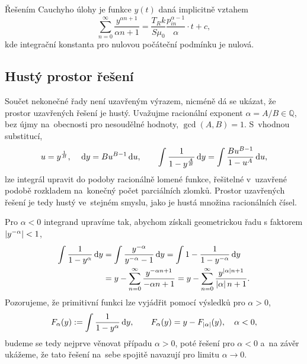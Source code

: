 Řešením Cauchyho úlohy  je funkce $y(t)$ daná implicitně vztahem
\begin{equation}\label{eq:general_cauchy_problem_alpha_solution}
    \sum_{n=0}^{\infty}\frac{y^{\alpha n+1}}{\alpha n+1}=\frac{T_R k}{S \mu_0}\frac{p_{in}^{\alpha-1}}{\alpha}\cdot t+c,
\end{equation}
kde integrační konstanta pro nulovou počáteční podmínku je nulová.


\subsection{Hustý prostor řešení}\label{ss:husty_prostor_reseni}
Součet nekonečné řady není uzavřeným výrazem, nicméně dá se ukázat, že prostor uzavřených řešení je hustý. Uvažujme racionální exponent $\alpha =A/B\in\mathbb{Q}$, bez újmy na~obecnosti pro nesoudělné hodnoty, $\gcd(A,B)=1$. S~vhodnou substitucí,
\begin{equation}\label{eq:rational_substitution}
    u=y^{\frac{1}{B}},\quad \,\mathrm{d}{y}=Bu^{B-1}\,\mathrm{d}{u},\qquad \int\frac{1}{1-y^{\frac{A}{B}}}\,\mathrm{d}{y}=\int\frac{Bu^{B-1}}{1-u^A}\,\mathrm{d}{u},
\end{equation}
lze integrál upravit do podoby racionálně lomené funkce, řešitelné v~uzavřené podobě rozkladem na~konečný počet parciálních zlomků. Prostor uzavřených řešení je tedy hustý ve~stejném smyslu, jako je hustá množina racionálních čísel.

Pro $\alpha<0$ integrand upravíme tak, abychom získali geometrickou řadu s faktorem $\left\lvert y^{-\alpha}\right\rvert<1$,
\begin{align}\label{eq:negative_alpha_absolute_value}
    \int\frac{1}{1-y^{\alpha}}\,\mathrm{d}{y}
    &=\int\frac{y^{-\alpha}}{y^{-\alpha}-1}\,\mathrm{d}{y}
    =\int 1-\frac{1}{1-y^{-\alpha}}\,\mathrm{d}{y}\nonumber\\
    &=y-\sum_{n=0}^{\infty}\frac{y^{-\alpha n+1}}{-\alpha n+1}
    =y-\sum_{n=0}^{\infty}\frac{y^{\left\lvert\alpha\right\rvert n+1}}{\left\lvert\alpha\right\rvert n+1}.
\end{align}
Pozorujeme, že primitivní funkci lze vyjádřit pomocí výsledků pro $\alpha>0$,
\begin{equation}\label{eq:negative_alpha_symmetry}
    F_\alpha(y):=\int\frac{1}{1-y^{\alpha}}\,\mathrm{d}{y},\qquad F_\alpha(y)=y-F_{\left\lvert\alpha\right\rvert}(y),\quad\alpha<0,
\end{equation}
budeme se tedy nejprve věnovat případu $\alpha>0$, poté řešení pro $\alpha<0$ a~na závěr ukážeme, že tato řešení na~sebe spojitě navazují pro limitu $\alpha \to0$.


